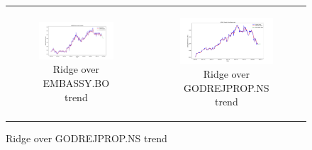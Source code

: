 \documentclass[11pt]{article}
\begin{document}
\begin{figure}[h!]
\begin{tabular}{cc}
        \begin{subfigure}[b]{0.48\textwidth}
            \centering
            \includegraphics[width=\linewidth]{figures/ridge/EMBASSY_predict.png}
            \caption{Ridge over EMBASSY.BO trend}
            \label{fig:1a}
        \end{subfigure} &
        \begin{subfigure}[b]{0.48\textwidth}
            \centering
            \includegraphics[width=\linewidth]{figures/ridge/GODREJPROP_predict.png}
            \caption{Ridge over GODREJPROP.NS trend}
            \label{fig:1b}
        \end{subfigure} \\
        

\end{tabular}
\end{figure}
\end{document}
